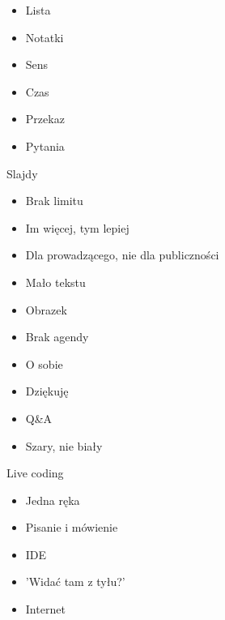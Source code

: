 \documentclass{beamer}
\begin{document}
\begin{frame}{}
	\begin{Large}
		\begin{itemize}
			\item Lista
			\item Notatki
			\item Sens
			\item Czas
			\item Przekaz
			\item Pytania
		\end{itemize}
	\end{Large}
\end{frame}

\begin{frame}{}
	\begin{center}
		\Huge{Slajdy}
	\end{center}
\end{frame}

\begin{frame}{}
	\begin{Large}
		\begin{itemize}
			\item Brak limitu
			\item Im więcej, tym lepiej
			\item Dla prowadzącego, nie dla publiczności
			\item Mało tekstu
			\item Obrazek
			\item Brak agendy
			\item O sobie
			\item Dziękuję
			\item Q\&A
			\item Szary, nie biały
		\end{itemize}
	\end{Large}
\end{frame}

\begin{frame}{}
	\begin{center}
		\Huge{Live coding}
	\end{center}
\end{frame}

\begin{frame}{}
	\begin{Large}
		\begin{itemize}
			\item Jedna ręka
			\item Pisanie i mówienie
			\item IDE
			\item 'Widać tam z tyłu?'
			\item Internet
		\end{itemize}
	\end{Large}
\end{frame}
\end{document}

